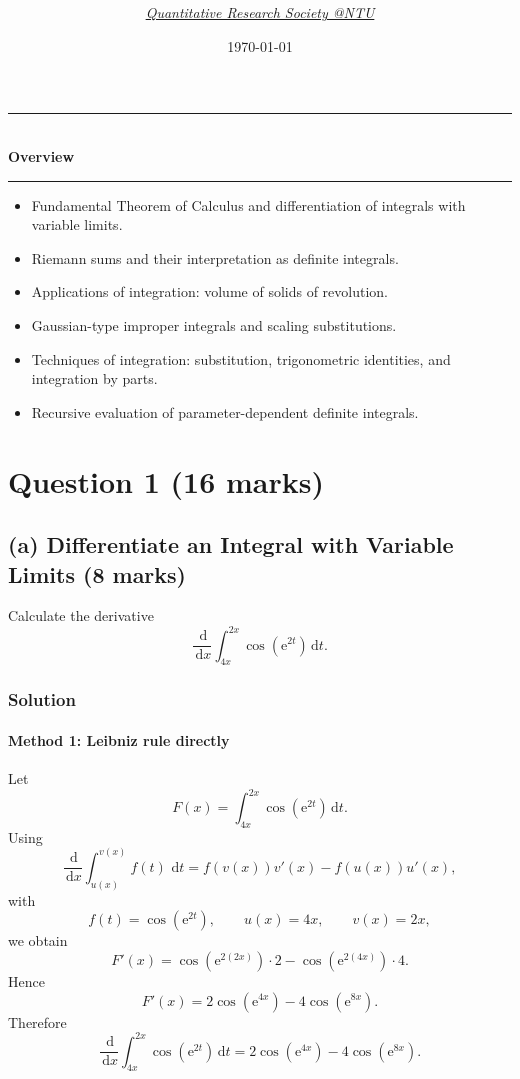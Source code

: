 \documentclass[12pt]{article}
\title{
\Huge \CourseCode\ \CourseName \\[0.3em]
\Large \DocType \\[0.3em]
\large \ExamMeta
}
\author{
  \textit{\href{https://qrsntu.org}{Quantitative Research Society @NTU}}
}
\date{\today}
\newcommand{\dd}{\,\mathrm{d}}
\newcommand{\ee}{\mathrm{e}}
\newenvironment{overview}{
  \par\bigskip
  \begin{center}
    \rule{0.92\linewidth}{0.6pt}\\[-0.2em]
    \textbf{Overview}\\[-0.2em]
    \rule{0.92\linewidth}{0.6pt}
  \end{center}
  \vspace{-0.3em}
  \begin{itemize}[leftmargin=1.6em, itemsep=0.2em, topsep=0.2em]
}{
  \end{itemize}
  \par\bigskip
}
\begin{document}
\maketitle
\thispagestyle{plainfirst}
\pagestyle{main}

\begin{overview}
  \item Fundamental Theorem of Calculus and differentiation of integrals with variable limits.
  \item Riemann sums and their interpretation as definite integrals.
  \item Applications of integration: volume of solids of revolution.
  \item Gaussian-type improper integrals and scaling substitutions.
  \item Techniques of integration: substitution, trigonometric identities, and integration by parts.
  \item Recursive evaluation of parameter-dependent definite integrals.
\end{overview}

\newpage
\tableofcontents
\newpage

\section{Question 1 \hfill (16 marks)}


\subsection{(a) Differentiate an Integral with Variable Limits \hfill (8 marks)}

Calculate the derivative
\[
\frac{\dd}{\dd x}\int_{4x}^{2x}\cos\!\left(\ee^{2t}\right)\dd t.
\]

\subsubsection{Solution}

\paragraph{Method 1: Leibniz rule directly}
Let
\[
F(x)=\int_{4x}^{2x}\cos\!\left(\ee^{2t}\right)\dd t.
\]
Using
\[
\frac{\dd}{\dd x}\int_{u(x)}^{v(x)} f(t)\,\dd t
=f(v(x))v'(x)-f(u(x))u'(x),
\]
with
\[
f(t)=\cos\!\left(\ee^{2t}\right),\qquad u(x)=4x,\qquad v(x)=2x,
\]
we obtain
\[
F'(x)=\cos\!\left(\ee^{2(2x)}\right)\cdot 2-\cos\!\left(\ee^{2(4x)}\right)\cdot 4.
\]
Hence
\[
F'(x)=2\cos\!\left(\ee^{4x}\right)-4\cos\!\left(\ee^{8x}\right).
\]
Therefore
\[
\boxed{\frac{\dd}{\dd x}\int_{4x}^{2x}\cos\!\left(\ee^{2t}\right)\dd t
=2\cos\!\left(\ee^{4x}\right)-4\cos\!\left(\ee^{8x}\right).}
\]
\end{document}
